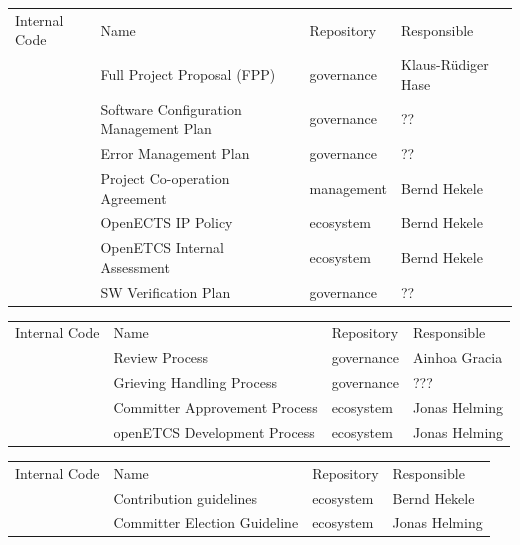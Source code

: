 \documentclass{template/openetcs_article}
\begin{document}
\begin{flushleft}
\begin{tabular}[H]{|m{2cm}|m{7cm}|m{2cm}|m{3cm}|}
\hline
\rowcolor{myblue}
\multicolumn{4}{|c|}{References} \\\hline
\rowcolor{lightgray}
Internal Code &
Name &
Repository &
Responsible  
\\\hline
\citep{fpp} &
Full Project Proposal (FPP) &
governance &
Klaus-Rüdiger Hase\\\hline
\cite{scmp} &
Software Configuration Management Plan &
governance &
??\\\hline
\cite{emp} &
Error Management Plan &
governance &
??\\\hline
\cite{PCA} &
Project Co-operation Agreement &
management &
Bernd Hekele\\\hline
\citep{IPP} &
OpenECTS IP Policy &
ecosystem &
Bernd Hekele\\\hline
\citep{IA} &
OpenETCS Internal Assessment &
ecosystem &
Bernd Hekele\\\hline
\cite{verification} &
SW Verification Plan &
governance &
??\\\hline
\end{tabular}
\end{flushleft}

\begin{flushleft}
\begin{tabular}[H]{|m{2cm}|m{7cm}|m{2cm}|m{3cm}|}
\hline
\rowcolor{myblue}
\multicolumn{4}{|c|}{Procedures} \\\hline
\rowcolor{lightgray}
Internal Code &
Name &
Repository &
Responsible  
\\\hline
\citep{RP} &
Review Process &
governance &
Ainhoa Gracia\\\hline
\cite{ghp} &
Grieving Handling Process &
governance &
???\\\hline
\cite{cap} &
Committer Approvement Process &
ecosystem &
Jonas Helming\\\hline
\cite{odp} &
openETCS Development Process &
ecosystem &
Jonas Helming\\\hline
\end{tabular}
\end{flushleft}

\begin{flushleft}
\begin{tabular}[H]{|m{2cm}|m{7cm}|m{2cm}|m{3cm}|}
\hline
\rowcolor{myblue}
\multicolumn{4}{|c|}{Guidelines} \\\hline
\rowcolor{lightgray}
Internal Code &
Name &
Repository &
Responsible  
\\\hline
\cite{Contribution} &
Contribution guidelines &
ecosystem &
Bernd Hekele\\\hline
\cite{committer} &
Committer Election Guideline &
ecosystem &
Jonas Helming\\\hline
\end{tabular}
\end{flushleft}
\end{document}
